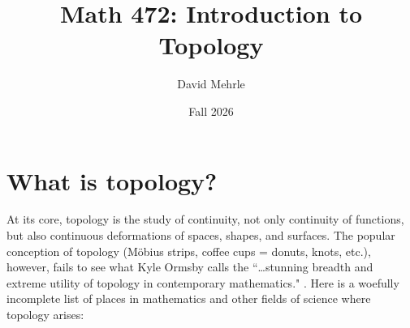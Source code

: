 \documentclass[noname]{notes}
\begin{document}
\title{Math 472: Introduction to Topology}
\author{David Mehrle} 
\date{Fall 2026} 
\maketitle

{\pagestyle{plain}
\tableofcontents
\cleardoublepage}


\newpage 


{\pagestyle{plain}
\listoflectures
\cleardoublepage}

\chapter*{What is topology?}

At its core, topology is the study of continuity, not only continuity of functions, but also continuous deformations of spaces, shapes, and surfaces. The popular conception of topology (M\"obius strips, coffee cups = donuts, knots, etc.), however, fails to see what Kyle Ormsby calls the ``\ldots stunning breadth and extreme utility of topology in contemporary mathematics." \cite[Week 1 Lecture Notes]{ormsby}. Here is a woefully incomplete list of places in mathematics and other fields of science where topology arises: 
\end{document}
